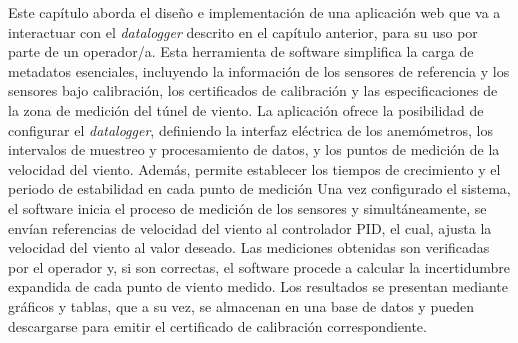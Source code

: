 Este capítulo aborda el diseño e implementación de una aplicación web que  va a interactuar con el \textit{datalogger} descrito en el capítulo anterior, para su uso por parte de un operador/a. Esta herramienta de software simplifica la carga de metadatos esenciales, incluyendo la información de los sensores de referencia y los sensores bajo calibración, los certificados de calibración y las especificaciones de la zona de medición del túnel de viento. La aplicación ofrece la posibilidad de configurar el \textit{datalogger}, definiendo la interfaz eléctrica de los anemómetros, los intervalos de muestreo y procesamiento de datos, y los puntos de medición de la velocidad del viento. Además, permite establecer los tiempos de crecimiento y el periodo de estabilidad en cada punto de medición Una vez configurado el sistema, el software inicia el proceso de medición de los sensores y simultáneamente, se envían referencias de velocidad del viento al controlador PID, el cual, ajusta la velocidad del viento al valor deseado. Las mediciones obtenidas son verificadas por el operador y, si son correctas, el software procede a calcular la incertidumbre expandida de cada punto de viento medido. Los resultados se presentan mediante gráficos y tablas, que a su vez, se almacenan en una base de datos y pueden descargarse para emitir el certificado de calibración correspondiente.


